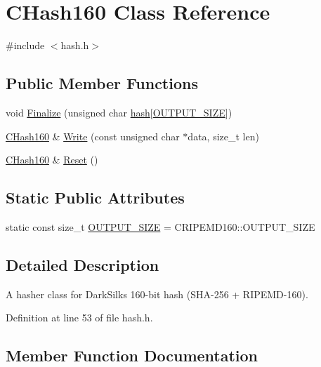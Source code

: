 \hypertarget{class_c_hash160}{}\section{C\+Hash160 Class Reference}
\label{class_c_hash160}


{\ttfamily \#include $<$hash.\+h$>$}

\subsection*{Public Member Functions}
\begin{DoxyCompactItemize}
\item 
void \hyperlink{class_c_hash160_a9bb08e1772002ae1a5d85017ba7952ee}{Finalize} (unsigned char \hyperlink{cache_8cc_a11ecb029164e055f28f4123ce3748862}{hash}\mbox{[}\hyperlink{class_c_hash160_a1a5618e17d91ea96e86d779f575211eb}{O\+U\+T\+P\+U\+T\+\_\+\+S\+I\+Z\+E}\mbox{]})
\item 
\hyperlink{class_c_hash160}{C\+Hash160} \& \hyperlink{class_c_hash160_af56cdd9443013eb68b246aa8450217f2}{Write} (const unsigned char $\ast$data, size\+\_\+t len)
\item 
\hyperlink{class_c_hash160}{C\+Hash160} \& \hyperlink{class_c_hash160_a971a8d59073455b1ef0ac0f65e964772}{Reset} ()
\end{DoxyCompactItemize}
\subsection*{Static Public Attributes}
\begin{DoxyCompactItemize}
\item 
static const size\+\_\+t \hyperlink{class_c_hash160_a1a5618e17d91ea96e86d779f575211eb}{O\+U\+T\+P\+U\+T\+\_\+\+S\+I\+Z\+E} = C\+R\+I\+P\+E\+M\+D160\+::\+O\+U\+T\+P\+U\+T\+\_\+\+S\+I\+Z\+E
\end{DoxyCompactItemize}


\subsection{Detailed Description}
A hasher class for Dark\+Silk\textquotesingle{}s 160-\/bit hash (S\+H\+A-\/256 + R\+I\+P\+E\+M\+D-\/160). 

Definition at line 53 of file hash.\+h.



\subsection{Member Function Documentation}
\hypertarget{class_c_hash160_a9bb08e1772002ae1a5d85017ba7952ee}{}
